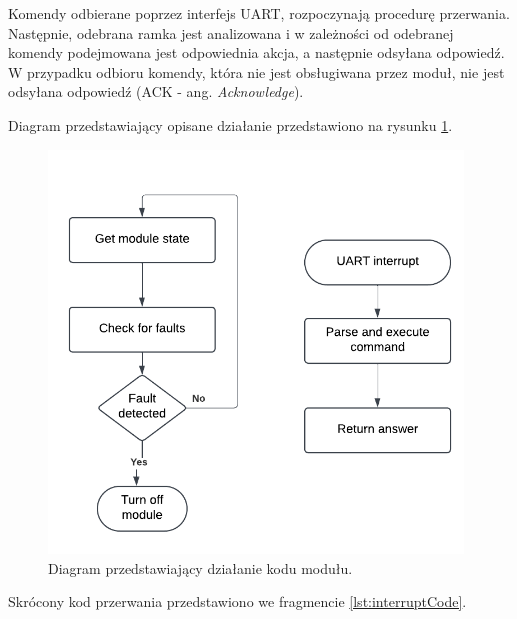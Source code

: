 Komendy odbierane poprzez interfejs UART, rozpoczynają procedurę przerwania. Następnie, odebrana ramka jest analizowana
i w zależności od odebranej komendy podejmowana jest odpowiednia akcja, a następnie odsyłana odpowiedź. W przypadku 
odbioru komendy, która nie jest obsługiwana przez moduł, nie jest odsyłana odpowiedź (ACK - ang. \textit{Acknowledge}).

Diagram przedstawiający opisane działanie przedstawiono na rysunku \ref{fig:submodule_code_diagram}.

\begin{figure}[h!]
    \begin{center}
        \includegraphics[width = 11cm]{images/submodule_code_diagram.png}
        \caption{Diagram przedstawiający działanie kodu modułu.} 
        \label{fig:submodule_code_diagram}
    \end{center}
\end{figure}

Skrócony kod przerwania przedstawiono we fragmencie \ref{lst:interruptCode}.


